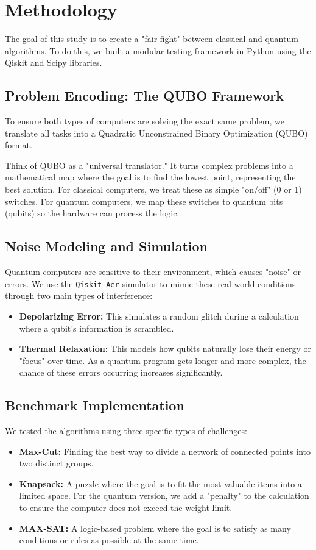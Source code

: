 \documentclass[12pt]{article}
\begin{document}
\section{Methodology}
The goal of this study is to create a "fair fight" between classical and quantum algorithms. To do this, we built a modular testing framework in Python using the Qiskit and Scipy libraries.

\subsection{Problem Encoding: The QUBO Framework}
To ensure both types of computers are solving the exact same problem, we translate all tasks into a Quadratic Unconstrained Binary Optimization (QUBO) format. 

Think of QUBO as a "universal translator." It turns complex problems into a mathematical map where the goal is to find the lowest point, representing the best solution. For classical computers, we treat these as simple "on/off" (0 or 1) switches. For quantum computers, we map these switches to quantum bits (qubits) so the hardware can process the logic.

\subsection{Noise Modeling and Simulation}
Quantum computers are sensitive to their environment, which causes "noise" or errors. We use the \texttt{Qiskit Aer} simulator to mimic these real-world conditions through two main types of interference:
\begin{itemize}
    \item \textbf{Depolarizing Error:} This simulates a random glitch during a calculation where a qubit's information is scrambled.
    \item \textbf{Thermal Relaxation:} This models how qubits naturally lose their energy or "focus" over time. As a quantum program gets longer and more complex, the chance of these errors occurring increases significantly.
\end{itemize}

\subsection{Benchmark Implementation}
We tested the algorithms using three specific types of challenges:
\begin{itemize}
    \item \textbf{Max-Cut:} Finding the best way to divide a network of connected points into two distinct groups.
    \item \textbf{Knapsack:} A puzzle where the goal is to fit the most valuable items into a limited space. For the quantum version, we add a "penalty" to the calculation to ensure the computer does not exceed the weight limit.
    \item \textbf{MAX-SAT:} A logic-based problem where the goal is to satisfy as many conditions or rules as possible at the same time.
\end{itemize}
\end{document}
